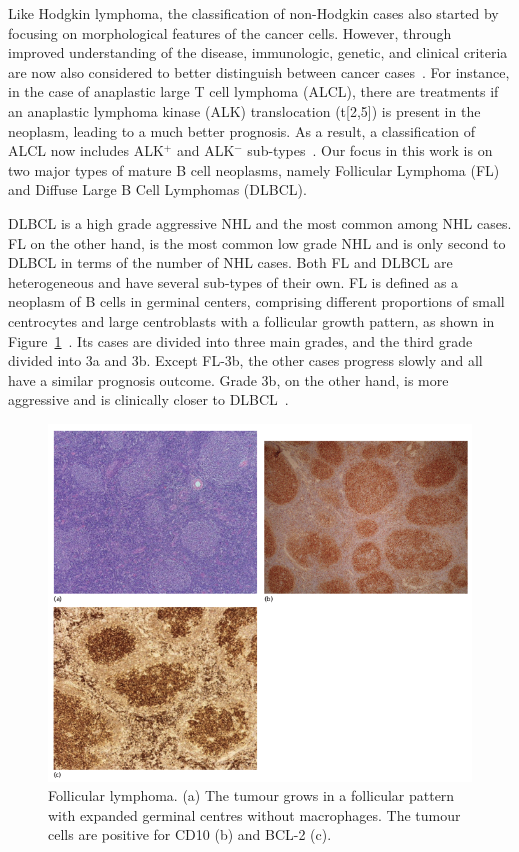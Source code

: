 Like Hodgkin lymphoma, the classification of non-Hodgkin cases also started by focusing on morphological features of the cancer cells. However, through improved understanding of the disease, immunologic, genetic, and clinical criteria are now also considered to better distinguish between cancer cases~\cite[Ch. 33]{hoffbrand2016postgraduate}. For instance, in the case of anaplastic large T cell lymphoma (ALCL), there are treatments if an anaplastic lymphoma kinase (ALK) translocation (t[2,5]) is present in the neoplasm, leading to a much better prognosis. As a result, a classification of ALCL now includes ALK$^+$ and ALK$^-$ sub-types~\cite[Ch. 29]{mendelsohn2014molecular}.
Our focus in this work is on two major types of mature B cell neoplasms, namely Follicular Lymphoma (FL) and Diffuse Large B Cell Lymphomas (DLBCL).

DLBCL is a high grade aggressive NHL and the most common among NHL cases. FL on the other hand, is the most common low grade NHL and is only second to DLBCL in terms of the number of NHL cases. Both FL and DLBCL are heterogeneous and have several sub-types of their own. FL is defined as a neoplasm of B cells in germinal centers, comprising different proportions of small centrocytes and large centroblasts with a follicular growth pattern, as shown in Figure~\ref{fig:bkg:fl}~\cite[Ch. 31]{hoffbrand2016postgraduate}. Its cases are divided into three main grades, and the third grade divided into 3a and 3b. Except FL-3b, the other cases progress slowly and all have a similar prognosis outcome. Grade 3b, on the other hand, is more aggressive and is clinically closer to DLBCL~\cite[Ch. 33]{hoffbrand2016postgraduate}.

\begin{figure}[!ht]
  \centering
  \includegraphics[width=1\textwidth]{figs/background/fl}
  \caption{Follicular lymphoma. (a) The tumour grows in a follicular pattern with expanded germinal centres without macrophages. The
tumour cells are positive for CD10 (b) and BCL-2 (c).\protect\footnotemark}
  \label{fig:bkg:fl}
\end{figure}

